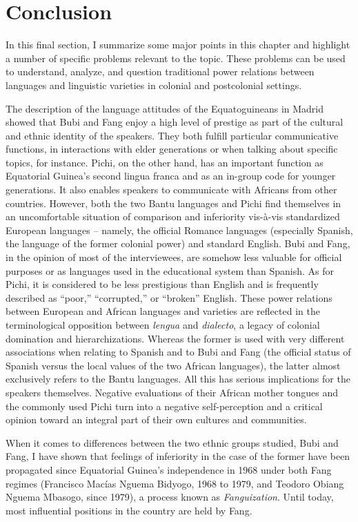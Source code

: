 \documentclass[output=paper]{langscibook}
\begin{document}
\section{Conclusion}\label{schlumpf:sec:conclusion}

In this final section, I summarize some major points in this chapter and highlight a number of specific problems relevant to the topic. These problems can be used to understand, analyze, and question traditional power relations between languages and linguistic varieties in colonial and postcolonial settings.

The description of the language attitudes of the Equatoguineans in Madrid showed that Bubi and Fang enjoy a high level of prestige as part of the cultural and ethnic identity of the speakers. They both fulfill particular communicative functions, in interactions with elder generations or when talking about specific topics, for instance. Pichi, on the other hand, has an important function as Equatorial Guinea’s second lingua franca and as an in-group code for younger generations. It also enables speakers to communicate with Africans from other countries. However, both the two Bantu languages and Pichi find themselves in an uncomfortable situation of comparison and inferiority vis-à-vis standardized European languages – namely, the official Romance languages (especially Spanish, the language of the former colonial power) and standard English. Bubi and Fang, in the opinion of most of the interviewees, are somehow less valuable for official purposes or as languages used in the educational system than Spanish. As for Pichi, it is considered to be less prestigious than English and is frequently described as “poor,” “corrupted,” or “broken” English. These power relations between European and African languages and varieties are reflected in the terminological opposition between \textit{lengua} and \textit{dialecto}, a legacy of colonial domination and hierarchizations. Whereas the former is used with very different associations when relating to Spanish and to Bubi and Fang (the official status of Spanish versus the local values of the two African languages), the latter almost exclusively refers to the Bantu languages. All this has serious implications for the speakers themselves. Negative evaluations of their African mother tongues and the commonly used Pichi turn into a negative self-perception and a critical opinion toward an integral part of their own cultures and communities.

When it comes to differences between the two ethnic groups studied, Bubi and Fang, I have shown that feelings of inferiority in the case of the former have been propagated since Equatorial Guinea’s independence in 1968 under both Fang regimes (Francisco Macías Nguema Bidyogo, 1968 to 1979, and Teodoro Obiang Nguema Mbasogo, since 1979), a process known as \textit{Fanguization}. Until today, most influential positions in the country are held by Fang.
\end{document}
